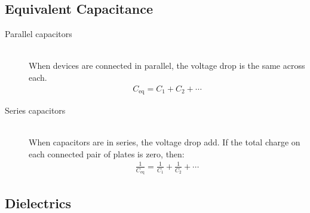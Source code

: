 \documentclass[../main.tex]{subfiles}
\begin{document}
\subsection{Equivalent Capacitance}
\label{sub:equivalent_capacitance}

\begin{description}
  \item[Parallel capacitors] \hfill \\
    When devices are connected in parallel, the voltage drop is the same across
    each.
    \begin{align}
      C_{\text{eq}} = C_1 + C_2 + \cdots
    \end{align}
  \item[Series capacitors] \hfill \\
    When capacitors are in series, the voltage drop add. If the total charge on
    each connected pair of plates is zero, then:
    \begin{align}
      \frac{1}{C_{\text{eq}}} = \frac{1}{C_1} + \frac{1}{C_2} + \cdots
    \end{align}
\end{description}

\subsection{Dielectrics}
\label{sub:dielectrics}
\end{document}
